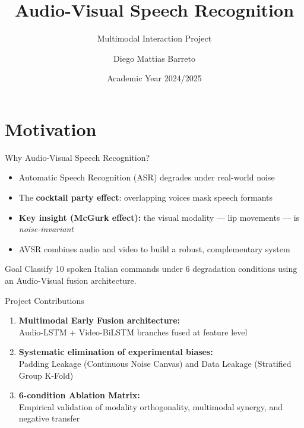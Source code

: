 \documentclass{beamer}
\title{Audio-Visual Speech Recognition}
\subtitle{Multimodal Interaction Project}
\author{Diego Mattias Barreto}
\date{Academic Year 2024/2025}
\begin{document}
\maketitle

\section{Motivation}

\begin{frame}{Why Audio-Visual Speech Recognition?}
  \begin{itemize}
    \item Automatic Speech Recognition (ASR) degrades under real-world noise
    \item The \textbf{cocktail party effect}: overlapping voices mask speech formants
    \item \textbf{Key insight (McGurk effect):} the visual modality --- lip movements --- is \emph{noise-invariant}
    \item AVSR combines audio and video to build a robust, complementary system
  \end{itemize}
  \vspace{0.5em}
  \begin{block}{Goal}
    Classify 10 spoken Italian commands under 6 degradation conditions using an Audio-Visual fusion architecture.
  \end{block}
\end{frame}

\begin{frame}{Project Contributions}
  \begin{enumerate}
    \item \textbf{Multimodal Early Fusion architecture:}\\
          Audio-LSTM + Video-BiLSTM branches fused at feature level
          \vspace{0.4em}
    \item \textbf{Systematic elimination of experimental biases:}\\
          Padding Leakage (Continuous Noise Canvas) and Data Leakage (Stratified Group K-Fold)
          \vspace{0.4em}
    \item \textbf{6-condition Ablation Matrix:}\\
          Empirical validation of modality orthogonality, multimodal synergy, and negative transfer
  \end{enumerate}
\end{frame}
\end{document}
